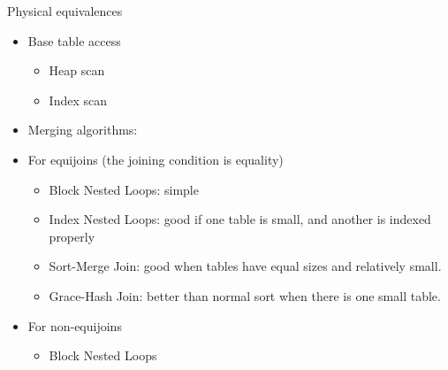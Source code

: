 \begin{frame}{Physical equivalences}
  \begin{itemize}
    \item Base table access
    \begin{itemize}
      \item Heap scan
      \item Index scan
    \end{itemize}
    \item Merging algorithms:
    \item For equijoins (the joining condition is equality)
    \begin{itemize}
      \item Block Nested Loops: simple
      \item Index Nested Loops: good if one table is small, and another is indexed properly
      \item Sort-Merge Join: good when tables have equal sizes and relatively small.
      \item Grace-Hash Join: better than normal sort when there is one small table.
    \end{itemize}
    \item For non-equijoins
    \begin{itemize}
      \item Block Nested Loops
    \end{itemize}
  \end{itemize}
\end{frame}

